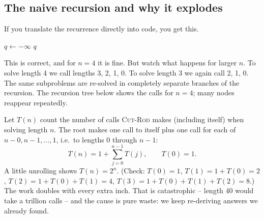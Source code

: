 \subsection{The naive recursion and why it explodes}

If you translate the recurrence directly into code, you get this.

\begin{algorithm}[H]
\caption{\textsc{Cut-Rod}$(p, n)$ -- naive recursion}
$q \gets -\infty$\;
\Return $q$\;
\end{algorithm}

This is correct, and for $n = 4$ it is fine. But watch what happens for larger
$n$. To solve length 4 we call lengths 3, 2, 1, 0. To solve length 3 we again
call 2, 1, 0. The same subproblems are re-solved in completely separate
branches of the recursion. The recursion tree below shows the calls for
$n = 4$; many nodes reappear repeatedly.

\begin{center}
\end{center}

Let $T(n)$ count the number of calls \textsc{Cut-Rod} makes (including
itself) when solving length $n$. The root makes one call to itself plus one
call for each of $n-0, n-1, \dots, 1$, i.e.\ to lengths $0$ through $n-1$:
\[
  T(n) = 1 + \sum_{j=0}^{n-1} T(j), \qquad T(0) = 1.
\]
A little unrolling shows $T(n) = 2^n$. (Check: $T(0) = 1$, $T(1) = 1 + T(0) = 2$, $T(2) = 1 + T(0) + T(1) = 4$, $T(3) = 1 + T(0) + T(1) + T(2) = 8$.) The work doubles with every extra inch. That
is catastrophic -- length 40 would take a trillion calls -- and the cause is
pure waste: we keep re-deriving answers we already found.

